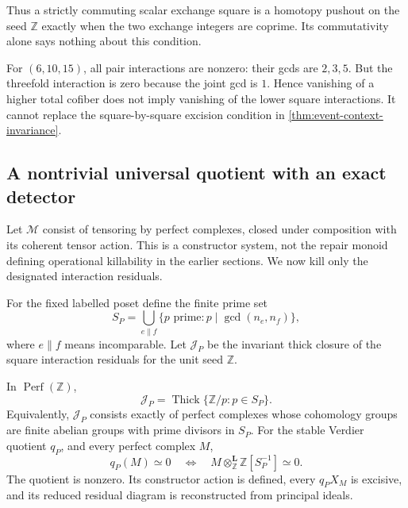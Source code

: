 Thus a strictly commuting scalar exchange square is a homotopy pushout on the seed $\mathbb Z$ exactly when the two exchange integers are coprime. Its commutativity alone says nothing about this condition.

\begin{example}\label{ex:higher-not-lower}
For $(6,10,15)$, all pair interactions are nonzero: their gcds are $2,3,5$. But the threefold interaction is zero because the joint gcd is $1$. Hence vanishing of a higher total cofiber does not imply vanishing of the lower square interactions. It cannot replace the square-by-square excision condition in \cref{thm:event-context-invariance}.
\end{example}

\subsection{A nontrivial universal quotient with an exact detector}

Let $\mathscr M$ consist of tensoring by perfect complexes, closed under composition with its coherent tensor action. This is a constructor system, not the repair monoid defining operational killability in the earlier sections. We now kill only the designated interaction residuals.

For the fixed labelled poset define the finite prime set
\[
 S_P=\bigcup_{e\parallel f}
 \{p\text{ prime}:p\mid\gcd(n_e,n_f)\},
\]
where $e\parallel f$ means incomparable. Let $\mathcal J_P$ be the invariant thick closure of the square interaction residuals for the unit seed $\mathbb Z$.

\begin{theorem}\label{thm:prime-overlap-quotient}
In $\operatorname{Perf}(\mathbb Z)$,
\[
 \boxed{\mathcal J_P=
 \operatorname{Thick}\{\mathbb Z/p:p\in S_P\}.}
\]
Equivalently, $\mathcal J_P$ consists exactly of perfect complexes whose cohomology groups are finite abelian groups with prime divisors in $S_P$. For the stable Verdier quotient $q_P$, and every perfect complex $M$,
\[
 q_P(M)\simeq0
 \quad\Longleftrightarrow\quad
 M\otimes^{\mathbf L}_{\mathbb Z}\mathbb Z[S_P^{-1}]\simeq0.
\]
The quotient is nonzero. Its constructor action is defined, every $q_PX_M$ is excisive, and its reduced residual diagram is reconstructed from principal ideals.
\end{theorem}

